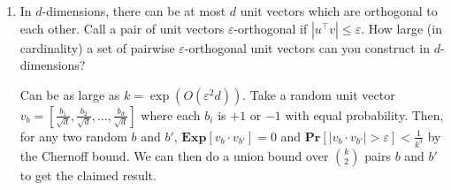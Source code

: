 \documentclass[11pt]{article}
\def\eps{\varepsilon}
\def\Pr{\mathbf{Pr}}
\def\Exp{\mathbf{Exp}}
\def\Pr{\mathbf{Pr}}
\def\Exp{\mathbf{Exp}}
\begin{document}
\begin{enumerate}
\vspace{0.5ex}




\item  In $d$-dimensions, there can be at most $d$ unit vectors which are orthogonal to each other.
Call a pair of unit vectors $\eps$-orthogonal if $|u^\top v|\leq \eps$. How large (in cardinality) a set of pairwise $\eps$-orthogonal unit vectors can you construct in $d$-dimensions?

Can be as large as $k=\exp(O(\eps^2 d))$. Take a random unit vector $v_b = [\frac{b_1}{\sqrt{d}}, \frac{b_2}{\sqrt{d}}, \dots, \frac{b_d}{\sqrt{d}}]$ where each $b_i$ is $+1$ or $-1$ with equal probability. Then, for any two random $b$ and $b'$, $\Exp[v_b \cdot v_{b'}] = 0$ and $\Pr[|v_b \cdot v_{b'}| > \eps] < \frac{1}{k^3}$ by the Chernoff bound. We can then do a union bound over ${k \choose 2}$ pairs $b$ and $b'$ to get the claimed result.

\end{enumerate}
\end{document}
